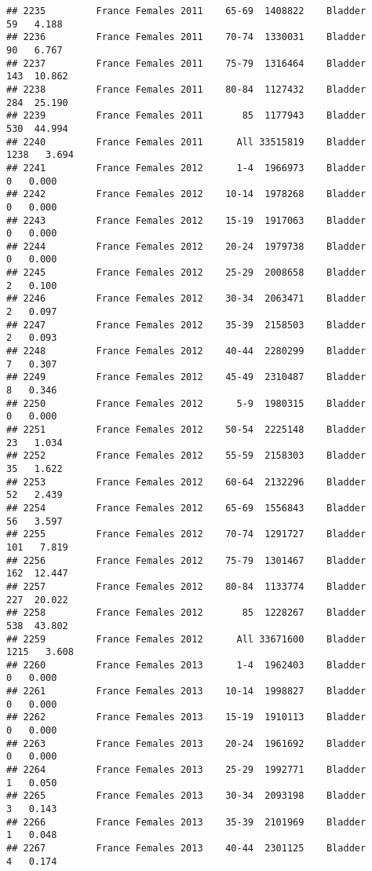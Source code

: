 \documentclass[
]{article}
\begin{document}
\begin{verbatim}
## 2235         France Females 2011    65-69  1408822    Bladder     59   4.188
## 2236         France Females 2011    70-74  1330031    Bladder     90   6.767
## 2237         France Females 2011    75-79  1316464    Bladder    143  10.862
## 2238         France Females 2011    80-84  1127432    Bladder    284  25.190
## 2239         France Females 2011       85  1177943    Bladder    530  44.994
## 2240         France Females 2011      All 33515819    Bladder   1238   3.694
## 2241         France Females 2012      1-4  1966973    Bladder      0   0.000
## 2242         France Females 2012    10-14  1978268    Bladder      0   0.000
## 2243         France Females 2012    15-19  1917063    Bladder      0   0.000
## 2244         France Females 2012    20-24  1979738    Bladder      0   0.000
## 2245         France Females 2012    25-29  2008658    Bladder      2   0.100
## 2246         France Females 2012    30-34  2063471    Bladder      2   0.097
## 2247         France Females 2012    35-39  2158503    Bladder      2   0.093
## 2248         France Females 2012    40-44  2280299    Bladder      7   0.307
## 2249         France Females 2012    45-49  2310487    Bladder      8   0.346
## 2250         France Females 2012      5-9  1980315    Bladder      0   0.000
## 2251         France Females 2012    50-54  2225148    Bladder     23   1.034
## 2252         France Females 2012    55-59  2158303    Bladder     35   1.622
## 2253         France Females 2012    60-64  2132296    Bladder     52   2.439
## 2254         France Females 2012    65-69  1556843    Bladder     56   3.597
## 2255         France Females 2012    70-74  1291727    Bladder    101   7.819
## 2256         France Females 2012    75-79  1301467    Bladder    162  12.447
## 2257         France Females 2012    80-84  1133774    Bladder    227  20.022
## 2258         France Females 2012       85  1228267    Bladder    538  43.802
## 2259         France Females 2012      All 33671600    Bladder   1215   3.608
## 2260         France Females 2013      1-4  1962403    Bladder      0   0.000
## 2261         France Females 2013    10-14  1998827    Bladder      0   0.000
## 2262         France Females 2013    15-19  1910113    Bladder      0   0.000
## 2263         France Females 2013    20-24  1961692    Bladder      0   0.000
## 2264         France Females 2013    25-29  1992771    Bladder      1   0.050
## 2265         France Females 2013    30-34  2093198    Bladder      3   0.143
## 2266         France Females 2013    35-39  2101969    Bladder      1   0.048
## 2267         France Females 2013    40-44  2301125    Bladder      4   0.174

\end{verbatim}
\end{document}
